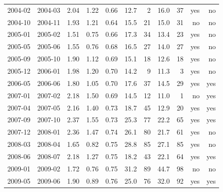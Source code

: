 \begin{table}[htbp]
\begin{tabular}{lrrrrrrrrrr}
2004-02 & 2004-03 & 2.04 & 1.22 & 0.66 & 12.7 & 2 & 16.0 & 37 & yes & no \\
2004-10 & 2004-11 & 1.93 & 1.21 & 0.64 & 15.5 & 21 & 15.0 & 31 & no & no \\
2005-01 & 2005-02 & 1.51 & 0.75 & 0.66 & 17.3 & 34 & 13.4 & 23 & yes & no \\
2005-05 & 2005-06 & 1.55 & 0.76 & 0.68 & 16.5 & 27 & 14.0 & 27 & yes & no \\
2005-09 & 2005-10 & 1.90 & 1.12 & 0.69 & 15.1 & 18 & 12.6 & 18 & yes & no \\
2005-12 & 2006-01 & 1.98 & 1.20 & 0.70 & 14.2 & 9 & 11.3 & 3 & yes & no \\
2006-05 & 2006-06 & 1.80 & 1.05 & 0.70 & 17.6 & 37 & 14.5 & 29 & yes & yes \\
2007-01 & 2007-02 & 2.18 & 1.50 & 0.69 & 14.5 & 12 & 11.0 & 1 & no & yes \\
2007-04 & 2007-05 & 2.16 & 1.40 & 0.73 & 18.7 & 45 & 12.9 & 20 & yes & yes \\
2007-09 & 2007-10 & 2.37 & 1.55 & 0.73 & 25.3 & 77 & 22.2 & 65 & yes & yes \\
2007-12 & 2008-01 & 2.36 & 1.47 & 0.74 & 26.1 & 80 & 21.7 & 61 & yes & no \\
2008-03 & 2008-04 & 1.65 & 0.82 & 0.75 & 28.8 & 85 & 27.1 & 85 & yes & no \\
2008-06 & 2008-07 & 2.18 & 1.27 & 0.75 & 18.2 & 43 & 22.1 & 64 & yes & yes \\
2009-01 & 2009-02 & 1.72 & 0.76 & 0.75 & 31.2 & 89 & 44.7 & 98 & no & no \\
2009-05 & 2009-06 & 1.90 & 0.89 & 0.76 & 25.0 & 76 & 32.0 & 92 & yes & yes \\
\bottomrule
\end{tabular}
\end{table}
